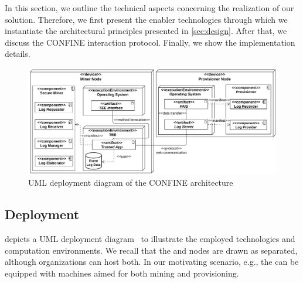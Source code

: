 In this section, we outline the technical aspects concerning the realization of our solution. Therefore, we first present the enabler technologies through which we instantiate the architectural principles presented in \cref{sec:design}. After that, we discuss the CONFINE interaction protocol. Finally, we show the implementation details.

%
\begin{figure}[t]
	\centering
	\includegraphics[width=1\linewidth]{content/figures/deploymentdiagram.pdf}
	\caption{UML deployment diagram of the CONFINE architecture}
	\label{fig:deployment_diagram}
\end{figure}
%
\subsection{Deployment}
\label{sec:deployment}
%
 depicts a UML deployment diagram~\citep{koch2002expressive} to illustrate the employed technologies and computation environments. %
We recall that the  and  nodes are drawn as separated, although organizations can host both.
In our motivating scenario, e.g., the  can be equipped with machines aimed for both mining and provisioning. %


